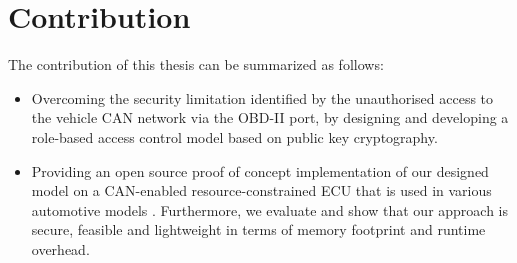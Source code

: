 \section{Contribution}
\label{sec:contributions}

The contribution of this thesis can be summarized as follows:

\begin{itemize}
	\item Overcoming the security limitation identified by the unauthorised access to the vehicle CAN network via the OBD-II port, by designing and developing a role-based access control model based on public key cryptography.
	
	\item Providing an open source proof of concept implementation of our designed model on a CAN-enabled resource-constrained ECU that is used in various automotive models \cite{Michel}. Furthermore, we evaluate and show that our approach is secure, feasible and lightweight in terms of memory footprint and runtime overhead.
\end{itemize} 

